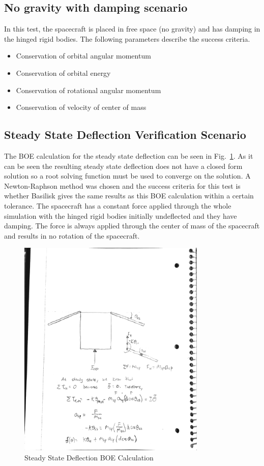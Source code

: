 \subsection{No gravity with damping scenario}
In this test, the spacecraft is placed in free space (no gravity) and has damping in the hinged rigid bodies. The following parameters describe the success criteria.
\begin{itemize}
\item Conservation of orbital angular momentum
\item Conservation of orbital energy
\item Conservation of rotational angular momentum
\item Conservation of velocity of center of mass
\end{itemize}

\subsection{Steady State Deflection Verification Scenario}

The BOE calculation for the steady state deflection can be seen in Fig.~\ref{fig:BOEThetaSS}. As it can be seen the resulting steady state deflection does not have a closed form solution so a root solving function must be used to converge on the solution. A Newton-Raphson method was chosen and the success criteria for this test is whether Basilisk gives the same results as this BOE calculation within a certain tolerance. The spacecraft has a constant force applied through the whole simulation with the hinged rigid bodies initially undeflected and they have damping. The force is always applied through the center of mass of the spacecraft and results in no rotation of the spacecraft. 

\begin{figure}[htbp]
	\centerline{
		\includegraphics[width=0.8\textwidth]{Figures/BOEThetaSS}}
	\caption{Steady State Deflection BOE Calculation}
	\label{fig:BOEThetaSS}
\end{figure}


